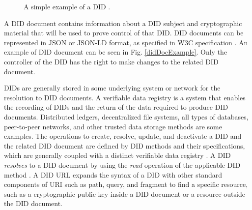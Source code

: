 \begin{figure}[h!]
    \centering
    
    \caption{A simple example of a DID \cite{didW3C}.}
    \label{didExample}
\end{figure}

A DID document contains information about a DID subject and cryptographic material that will be used to prove control of that DID. DID documents can be represented in JSON \cite{json-rfc3986} or JSON-LD \cite{json-ld} format, as specified in W3C specification \cite{didW3C}. An example of DID document can be seen in Fig. \ref{didDocExample}. Only the controller of the DID has the right to make changes to the related DID document.

DIDs are generally stored in some underlying system or network for the resolution to DID documents. A verifiable data registry is a system that enables the recording of DIDs and the return of the data required to produce DID documents. Distributed ledgers, decentralized file systems, all types of databases, peer-to-peer networks, and other trusted data storage methods are some examples. The operations to create, resolve, update, and deactivate a DID and the related DID document are defined by DID methods and their specifications, which are generally coupled with a distinct verifiable data registry \cite{didW3C}. A DID \textit{resolves} to a DID document by using the \textit{read} operation of the applicable DID method \cite{didW3C}.
A DID URL expands the syntax of a DID with other standard components of URI such as path, query, and fragment to find a specific resource, such as a cryptographic public key inside a DID document or a resource outside the DID document. \\



